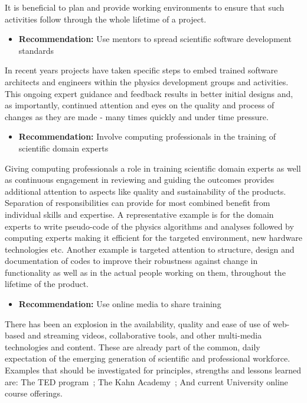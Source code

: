 It is beneficial to plan and provide working environments to ensure
that such activities follow through the whole lifetime of a
project.

\begin{itemize}
\item[] {\bf Recommendation:} Use mentors to spread scientific software development standards
\end{itemize}

In recent years projects have taken specific steps to embed
trained software architects and engineers within the physics
development groups and activities. This ongoing expert guidance and
feedback results in better initial designs and, as importantly,
continued attention and eyes on the quality and process of changes
as they are made - many times quickly and under time pressure.

\begin{itemize}
\item[] {\bf Recommendation:} Involve computing professionals in the training of scientific domain experts
\end{itemize}

Giving computing professionals a role in training scientific domain
experts as well as continuous engagement in reviewing and guiding
the outcomes provides additional  attention to aspects like quality
and sustainability of the  products.  Separation of responsibilities
can provide for most combined benefit from individual skills and
expertise.  A representative example is for the domain experts to
write pseudo-code of the physics algorithms and analyses followed
by computing experts making it efficient for the targeted environment,
new hardware technologies etc.  Another example is targeted attention
to structure,  design and documentation of codes to improve their
robustness against change in functionality  as well as in the actual
people  working on them, throughout the lifetime of the product.

\begin{itemize}
\item[] {\bf Recommendation:} Use online media to share training
\end{itemize}

There has been an explosion in the availability, quality and ease
of use of web-based and streaming videos, collaborative tools, and
other multi-media technologies and content. These are already part
of the common, daily expectation of the emerging generation of
scientific and professional workforce. Examples that should be
investigated for principles, strengths and lessons learned are: The
TED program~\cite{TED}; The Kahn Academy~\cite{KHANACAD}; And current
University  online course offerings.

